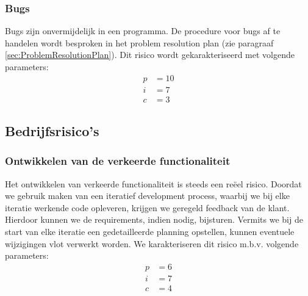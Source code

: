 \subsubsection{Bugs}
Bugs zijn onvermijdelijk in een programma. De procedure voor bugs af te handelen wordt besproken in het problem resolution plan (zie paragraaf \ref{sec:ProblemResolutionPlan}). Dit risico wordt gekarakteriseerd met volgende parameters:
\begin{align*}
	p &= 10\\
	i &= 7\\
	c &= 3
\end{align*}

\subsection{Bedrijfsrisico's}
\subsubsection{Ontwikkelen van de verkeerde functionaliteit}
Het ontwikkelen van verkeerde functionaliteit is steeds een re\"{e}el risico. Doordat we gebruik maken van een iteratief development process, waarbij we bij elke iteratie werkende code opleveren, krijgen we geregeld feedback van de klant. Hierdoor kunnen we de requirements, indien nodig, bijsturen. Vermits we bij de start van elke iteratie een gedetailleerde planning opstellen, kunnen eventuele wijzigingen vlot verwerkt worden. We karakteriseren dit risico m.b.v. volgende parameters:
\begin{align*}
	p &= 6\\
	i &= 7\\
	c &= 4
\end{align*}

